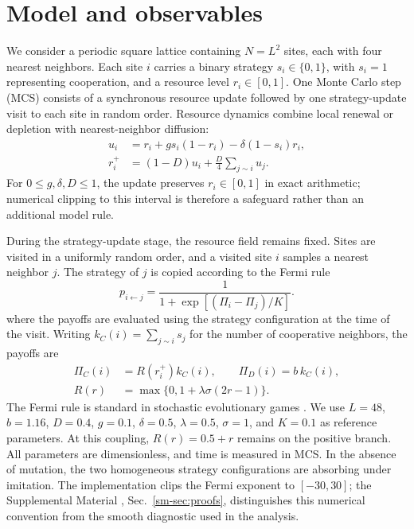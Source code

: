 \section{Model and observables}

We consider a periodic square lattice containing $N=L^2$ sites, each with four nearest neighbors. Each site $i$ carries a binary strategy $s_i\in\{0,1\}$, with $s_i=1$ representing cooperation, and a resource level $r_i\in[0,1]$. One Monte Carlo step (MCS) consists of a synchronous resource update followed by one strategy-update visit to each site in random order. Resource dynamics combine local renewal or depletion with nearest-neighbor diffusion:
\begin{equation}
\label{eq:resource}
\begin{aligned}
u_i&=r_i+g s_i(1-r_i)-\delta(1-s_i)r_i,\\
r_i^{+}&=(1-D)u_i+\frac D4\sum_{j\sim i}u_j .
\end{aligned}
\end{equation}
For $0\le g,\delta,D\le1$, the update preserves $r_i\in[0,1]$ in exact arithmetic; numerical clipping to this interval is therefore a safeguard rather than an additional model rule.

During the strategy-update stage, the resource field remains fixed. Sites are visited in a uniformly random order, and a visited site $i$ samples a nearest neighbor $j$. The strategy of $j$ is copied according to the Fermi rule
\begin{equation}
\label{eq:fermi}
p_{i\leftarrow j}=\frac{1}{1+\exp[(\Pi_i-\Pi_j)/K]} .
\end{equation}
where the payoffs are evaluated using the strategy configuration at the time of the visit. Writing $k_C(i)=\sum_{j\sim i}s_j$ for the number of cooperative neighbors, the payoffs are
\begin{equation}
\label{eq:payoffs}
\begin{aligned}
\Pi_C(i)&=R(r_i^+)k_C(i),\qquad \Pi_D(i)=b\,k_C(i),\\
R(r)&=\max\{0,1+\lambda\sigma(2r-1)\}.
\end{aligned}
\end{equation}
The Fermi rule is standard in stochastic evolutionary games \cite{szabo1998lattice,traulsen2006stochastic}. We use $L=48$, $b=1.16$, $D=0.4$, $g=0.1$, $\delta=0.5$, $\lambda=0.5$, $\sigma=1$, and $K=0.1$ as reference parameters. At this coupling, $R(r)=0.5+r$ remains on the positive branch. All parameters are dimensionless, and time is measured in MCS. In the absence of mutation, the two homogeneous strategy configurations are absorbing under imitation. The implementation clips the Fermi exponent to $[-30,30]$; the Supplemental Material \cite{supplement}, Sec.~\ref{sm-sec:proofs}, distinguishes this numerical convention from the smooth diagnostic used in the analysis.

